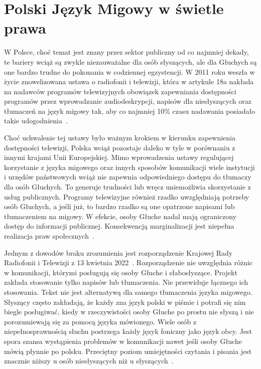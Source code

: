 \section{Polski Język Migowy w świetle prawa}
\label{sec:polish-sign-language}

W Polsce, choć temat jest znany przez sektor publiczny od co najmniej dekady, te bariery wciąż są zwykle niezauważalne dla osób słyszących, ale dla Głuchych są one bardzo trudne do pokonania w codziennej egzystencji. W 2011 roku weszła w życie znowelizowana ustawa o radiofonii i telewizji, która w artykule 18a nakłada na nadawców programów telewizyjnych obowiązek zapewniania dostępności programów przez wprowadzanie audiodeskrypcji, napisów dla niesłyszących oraz tłumaczeń na język migowy tak, aby co najmniej 10\% czasu nadawania posiadało takie udogodnienia~\cite{ustawa1992}.

Choć uchwalenie tej ustawy było ważnym krokiem w kierunku zapewnienia dostępności telewizji, Polska wciąż pozostaje daleko w tyle w porównaniu z innymi krajami Unii Europejskiej. Mimo wprowadzenia ustawy regulującej korzystanie z języka migowego oraz innych sposobów komunikacji wiele instytucji i urzędów państwowych wciąż nie zapewnia odpowiedniego dostępu do tłumaczy dla osób Głuchych. To generuje trudności lub wręcz uniemożliwia skorzystanie z usług publicznych. Programy telewizyjne również rzadko uwzględniają potrzeby osób Głuchych, a jeśli już, to bardzo rzadko są one opatrzone napisami lub tłumaczeniem na migowy. W efekcie, osoby Głuche nadal mają ograniczony dostęp do informacji publicznej. Konsekwencją marginalizacji jest niepełna realizacja praw społecznych~\cite{teper2016}.

Jednym z dowodów braku zrozumienia jest rozporządzenie Krajowej Rady Radiofonii i Telewizji z 13 kwietnia 2022~\cite{rozporzadzenie2022}. Rozporządzenie nie uwzględnia różnic w komunikacji, którymi posługują się osoby Głuche i słabosłyszące. Projekt zakłada stosowanie tylko napisów lub tłumaczenia. Nie przewiduje łącznego ich stosowania. Tekst nie jest alternatywą dla samego tłumaczenia języka migowego. Słyszący często zakładają, że każdy zna język polski w piśmie i potrafi się nim biegle posługiwać, kiedy w rzeczywistości osoby Głuche po prostu nie słyszą i nie porozumiewają się za pomocą języka mówionego. Wiele osób z niepełnosprawnością słuchu postrzega każdy język foniczny jako język obcy. Jest spora szansa wystąpienia problemów w komunikacji nawet jeśli osoby Głuche mówią płynnie po polsku. Przeciętny poziom umiejętności czytania i pisania jest znacznie niższy u osób niesłyszących niż u słyszących~\cite{perfetti2000}.
